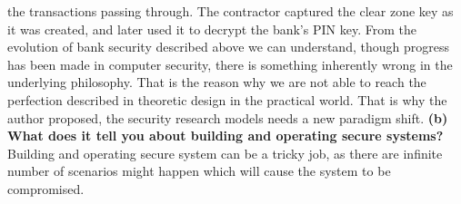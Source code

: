 \documentclass{article}
\begin{document}
the transactions passing through. The contractor captured the clear zone
key as it was created, and later used it to decrypt the bank’s PIN key.
\newline \newline From the evolution of bank security described above we can understand, though progress has been made in computer security, there is something inherently wrong in the underlying philosophy. That is the reason why we are not able to reach the perfection described in theoretic design in the practical world. That is why the author proposed, the security research models needs a new paradigm shift. 
\newline \newline  \textbf{(b) What does it tell you about building and operating secure systems?}
\newline \newline Building and operating secure system can be a tricky job, as there are infinite number of scenarios might happen which will cause the system to be compromised. 
\end{document}
